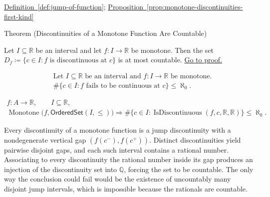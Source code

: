 \begin{dependencies}
\hyperref[def:jump-of-function]{Definition~\ref*{def:jump-of-function}}; \hyperref[prop:monotone-discontinuities-first-kind]{Proposition~\ref*{prop:monotone-discontinuities-first-kind}}
\end{dependencies}

\begin{theorembox}{Theorem (Discontinuities of a Monotone Function Are Countable)}
\begin{theorem}
\label{thm:monotone-discontinuities-countable}
Let $I \subseteq \mathbb{R}$ be an interval and let $f:I\to\mathbb{R}$ be monotone. Then the set $D_f \coloneqq \{c \in I : f \text{ is discontinuous at } c\}$ is at most countable. \hyperref[prf:monotone-discontinuities-countable]{Go to proof.}
\end{theorem}
\end{theorembox}

\begin{remark*}
\[
\begin{aligned}
&\text{Let } I \subseteq \mathbb{R} \text{ be an interval and } f:I\to\mathbb{R} \text{ be monotone}.\\
&\#\{c \in I : f \text{ fails to be continuous at } c\} \le \aleph_0.
\end{aligned}
\]
\end{remark*}

\begin{remark*}
\[
\begin{aligned}
  f\colon A\to\mathbb{R},\qquad
  I\subseteq\mathbb{R},\\
\operatorname{Monotone}\bigl(f,\mathsf{OrderedSet}(I,\leq)\bigr) \Longrightarrow \#\{c \in I : \operatorname{IsDiscontinuous}(f,c,\mathbb{R},\mathbb{R})\} \le \aleph_0.
\end{aligned}
\]
\end{remark*}

\begin{remark*}[Interpretation]
Every discontinuity of a monotone function is a jump discontinuity with a nondegenerate vertical gap $(f(c^-),f(c^+))$. Distinct discontinuities yield pairwise disjoint gaps, and each such interval contains a rational number. Associating to every discontinuity the rational number inside its gap produces an injection of the discontinuity set into $\mathbb{Q}$, forcing the set to be countable. The only way the conclusion could fail would be the existence of uncountably many disjoint jump intervals, which is impossible because the rationals are countable.
\end{remark*}

